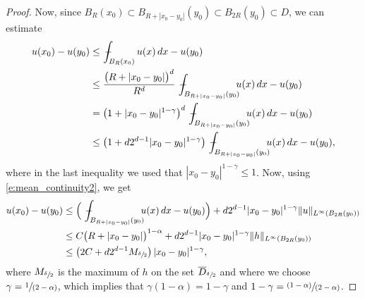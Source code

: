\documentclass[JEP,XML,SOM,Unicode]{cedram}
\newcommand{\pspfrac}[2]{\sfrac{(#1)}{(#2)}}
\newcommand{\spfrac}[2]{\sfrac{#1}{(#2)}}
\theoremstyle{plain}
\theoremstyle{definition}
\let\ds\displaystyle
\newcommand{\mean}[1]{\,-\hskip-1.08em\int_{#1}}
\begin{document}
\begin{proof}
Now, since $B_{R}(x_0)\subset B_{R+|x_0-y_0|}(y_0)\subset B_{2R}(y_0)\subset D$, we can estimate
\begin{align*}
u(x_0)-u(y_0)&\le \mean{B_R(x_0)}{u(x)\,dx}-u(y_0)\\
&\le \frac{\big(R+|x_0-y_0|\big)^d}{R^d}\mean{B_{R+|x_0-y_0|}(y_0)}{\hspace*{-2mm}u(x)\,dx}-u(y_0)\\
&= \left(1+|x_0-y_0|^{1-\gamma}\right)^d\mean{B_{R+|x_0-y_0|}(y_0)}{\hspace*{-2mm}u(x)\,dx}-u(y_0)\\
&\le \left(1+d2^{d-1}|x_0-y_0|^{1-\gamma}\right)\mean{B_{R+|x_0-y_0|}(y_0)}{\hspace*{-2mm}u(x)\,dx}-u(y_0),
\end{align*}
where in the last inequality we used that $|x_0-y_0|^{1-\gamma}\le 1$. Now, using \eqref{e:mean_continuity2}, we get
\begin{align*}
u(x_0)-u(y_0)
&\le \Big(\mean{B_{R+|x_0-y_0|}(y_0)}{\hspace*{-2mm}u(x)\,dx}-u(y_0)\Big)+d2^{d-1}|x_0-y_0|^{1-\gamma}\|u\|_{L^\infty(B_{2R}(y_0))}\\
&\le C\big(R+|x_0-y_0|\big)^{1-\alpha}+d2^{d-1}|x_0-y_0|^{1-\gamma}\|h\|_{L^\infty(B_{2R}(y_0))}\\
&\le \left(2C+d2^{d-1}M_{\sfrac\delta2}\right)|x_0-y_0|^{1-\gamma},
\end{align*}
where $M_{\sfrac\delta2}$ is the maximum of $h$ on the set $\overline D_{\sfrac\delta2}$ and where we choose $\ds\gamma=\spfrac1{2-\alpha}$, which implies that
$\gamma(1-\alpha)=1-\gamma$ and $\ds1-\gamma=\pspfrac{1-\alpha}{2-\alpha}$.
\end{proof}
\end{document}
